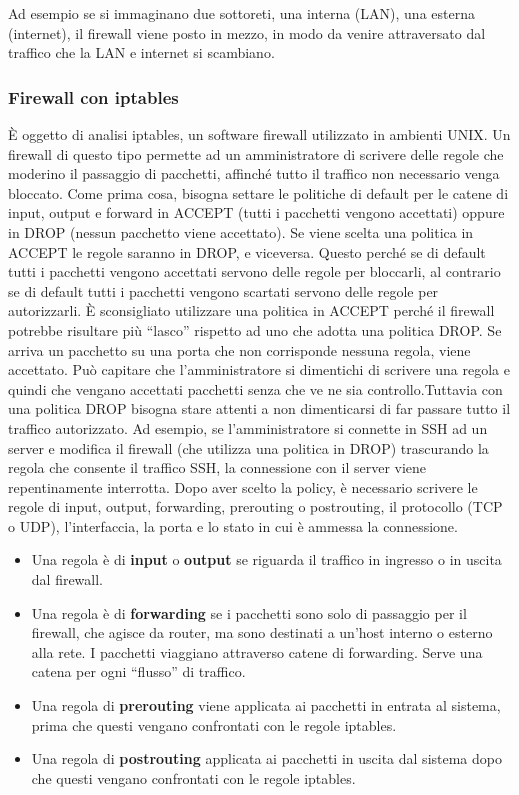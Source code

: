 Ad esempio se si immaginano due sottoreti, una interna (LAN), una esterna (internet), il firewall viene posto in mezzo, in modo da venire attraversato dal traffico che la LAN e internet si scambiano.

\subsubsection{Firewall con iptables}

È oggetto di analisi iptables, un software firewall utilizzato in ambienti UNIX. Un firewall di questo tipo permette ad un amministratore di scrivere delle regole che moderino il passaggio di pacchetti, affinché tutto il traffico non necessario venga bloccato.
Come prima cosa, bisogna settare le politiche di default per le catene di input, output e forward in ACCEPT (tutti i pacchetti vengono accettati) oppure in DROP (nessun pacchetto viene accettato). Se viene scelta una politica in ACCEPT le regole saranno in DROP, e viceversa. Questo perché se di default tutti i pacchetti vengono accettati servono delle regole per bloccarli, al contrario se di default tutti i pacchetti vengono scartati servono delle regole per autorizzarli.
È sconsigliato utilizzare una politica in ACCEPT perché il firewall potrebbe risultare più ``lasco'' rispetto ad uno che adotta una politica DROP. Se arriva un pacchetto su una porta che non corrisponde nessuna regola, viene accettato. Può capitare che l'amministratore si dimentichi di scrivere una regola e quindi che vengano accettati pacchetti senza che ve ne sia controllo.Tuttavia con una politica DROP bisogna stare attenti a non dimenticarsi di far passare tutto il traffico autorizzato.
Ad esempio, se l'amministratore si connette in SSH ad un server e modifica il firewall (che utilizza una politica in DROP) trascurando la regola che consente il traffico SSH, la connessione con il server viene repentinamente interrotta.
Dopo aver scelto la policy, è necessario scrivere le regole di input, output, forwarding, prerouting o postrouting, il protocollo (TCP o UDP), l'interfaccia, la porta e lo stato in cui è ammessa la connessione.

\begin{itemize}
    \item Una regola è di \textbf{input} o \textbf{output} se riguarda il traffico in ingresso o in uscita dal firewall.
    \item Una regola è di \textbf{forwarding} se i pacchetti sono solo di passaggio per il firewall, che agisce da router, ma sono destinati a un'host interno o esterno alla rete. I pacchetti viaggiano attraverso catene di forwarding. Serve una catena per ogni ``flusso'' di traffico.
    \item Una regola di \textbf{prerouting} viene applicata ai pacchetti in entrata al sistema, prima che questi vengano confrontati con le regole iptables.
    \item  Una regola di \textbf{postrouting} applicata ai pacchetti in uscita dal sistema dopo che questi vengano confrontati con le regole iptables.
\end{itemize}

